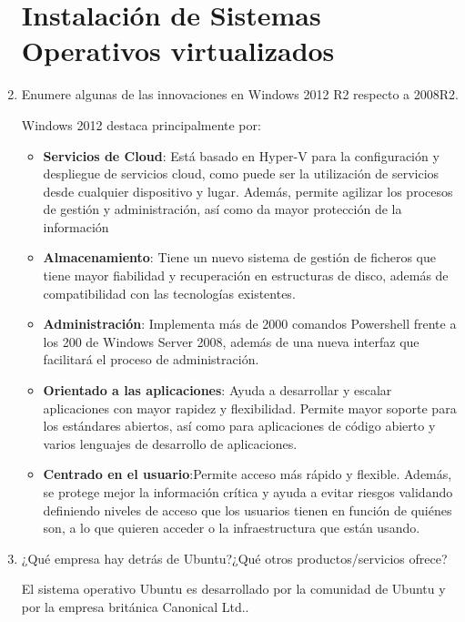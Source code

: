 \documentclass[paper=a4, fontsize=11pt]{scrartcl} %
\numberwithin{equation}{section} %
\numberwithin{figure}{section} %
\numberwithin{table}{section} %
\begin{document}
\begin{enumerate}
	\section{Instalación de Sistemas Operativos virtualizados}
		\item Enumere algunas de las innovaciones en Windows 2012 R2 respecto a 2008R2.
		
		Windows 2012 destaca principalmente por:
		\begin{itemize}
			\item \textbf{Servicios de Cloud}\cite{Hoja_Datos}\cite{Overview}\cite{TechWeek}:
			Está basado en Hyper-V para la configuración y despliegue de servicios cloud, como
			puede ser la utilización de servicios desde cualquier dispositivo y lugar. Además,
			permite agilizar los procesos de gestión y administración, así como da mayor
			protección de la información
			\item \textbf{Almacenamiento}\cite{TechWeek}: Tiene un nuevo sistema de gestión de
			ficheros que tiene mayor fiabilidad y recuperación en estructuras de disco, además
			de compatibilidad con las tecnologías existentes.
			\item \textbf{Administración}\cite{TechWeek}: Implementa más de 2000 comandos
			Powershell frente a los 200 de Windows Server 2008, además de una nueva interfaz
			que facilitará el proceso de administración.
			\item \textbf{Orientado a las aplicaciones}\cite{Hoja_Datos}\cite{Overview}: Ayuda a
			desarrollar y escalar aplicaciones con mayor rapidez y flexibilidad. Permite mayor
			soporte para los estándares abiertos, así como para aplicaciones de código abierto y
			varios lenguajes de desarrollo de aplicaciones.
			\item \textbf{Centrado en el usuario}\cite{Hoja_Datos}\cite{Overview}:Permite acceso
			más rápido y flexible. Además, se protege mejor la información crítica y ayuda a
			evitar riesgos validando definiendo niveles de acceso que los usuarios tienen en
			función de quiénes son, a lo que quieren acceder o la infraestructura que están usando.
		\end{itemize}
		
		\item ¿Qué empresa hay detrás de Ubuntu?¿Qué otros productos/servicios ofrece?
		
		El sistema operativo Ubuntu\cite{Ubuntu} es desarrollado por la comunidad de Ubuntu y por la
		empresa británica Canonical Ltd.\cite{Canonical}.
		

\end{enumerate}
\end{document}
